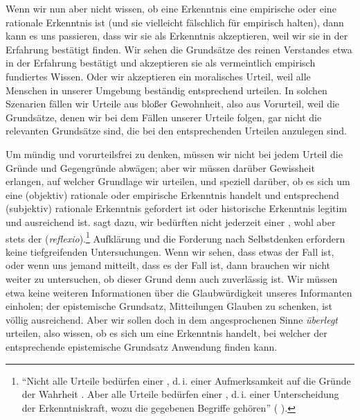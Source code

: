 Wenn wir nun aber nicht wissen, ob eine Erkenntnis eine
empirische oder eine rationale Erkenntnis ist (und sie vielleicht fälschlich
für empirisch halten), dann kann es uns passieren, dass wir sie als Erkenntnis
akzeptieren, weil wir sie in der Erfahrung bestätigt finden. Wir sehen die
Grundsätze des reinen Verstandes etwa in der Erfahrung bestätigt und akzeptieren
sie als vermeintlich empirisch fundiertes Wissen. Oder wir akzeptieren ein
moralisches Urteil, weil alle Menschen in unserer Umgebung beständig
entsprechend urteilen. In solchen Szenarien fällen wir Urteile aus bloßer
Gewohnheit, also aus Vorurteil, weil die Grundsätze, denen wir bei dem Fällen
unserer Urteile folgen, gar nicht die relevanten Grundsätze sind, die bei den
entsprechenden Urteilen anzulegen sind.

Um mündig und vorurteilsfrei zu denken, müssen wir nicht bei jedem Urteil
die Gründe und Gegengründe abwägen; aber wir müssen darüber Gewissheit erlangen,
auf welcher Grundlage wir urteilen, und speziell darüber, ob es sich um eine
(objektiv) rationale oder empirische Erkenntnis handelt und entsprechend
(subjektiv) rationale Erkenntnis gefordert ist oder historische Erkenntnis
legitim und ausreichend ist.  sagt dazu, wir bedürften
nicht jederzeit einer , wohl aber stets der
 (\emph{reflexio}).\footnote{\enquote{Nicht alle Urteile
bedürfen einer , d.\,i. einer Aufmerksamkeit auf die Gründe
der Wahrheit {\punkt}. Aber alle Urteile {\punkt} bedürfen einer
, d.\,i. einer Unterscheidung der Erkenntniskraft, wozu die
gegebenen Begriffe gehören}
\mkbibparens{\cite[][B 316\,f.,]{Kant:KritikderreinenVernunft2003}
\cite[][III: 215.12--18]{Kant:GesammelteWerke1900ff.}}.} Aufklärung und die
Forderung nach Selbstdenken erfordern keine tiefgreifenden Untersuchungen. Wenn
wir sehen, dass etwas der Fall ist, oder wenn uns jemand mitteilt, dass es der
Fall ist, dann brauchen wir nicht weiter zu untersuchen, ob dieser Grund denn
auch zuverlässig ist. Wir müssen etwa keine weiteren Informationen über die
Glaubwürdigkeit unseres Informanten einholen; der epistemische Grundsatz,
Mitteilungen Glauben zu schenken, ist völlig ausreichend.
Aber wir sollen doch in dem angesprochenen Sinne \emph{überlegt} urteilen, also
wissen, ob es sich um eine Erkenntnis handelt, bei welcher der entsprechende epistemische
Grundsatz Anwendung finden kann.

